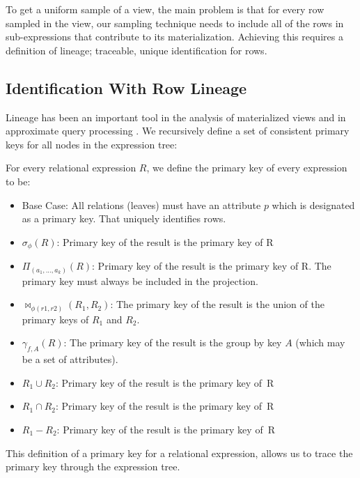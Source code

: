 To get a uniform sample of a view, the main problem is that for every row sampled in the view, our sampling technique needs to include all of the rows in sub-expressions that contribute to its materialization.
Achieving this requires a definition of lineage; traceable, unique identification for rows.

\subsection{Identification With Row Lineage}
\label{lin}
Lineage has been an important tool in the analysis of materialized views \cite{DBLP:journals/vldb/CuiW03} and in approximate query processing \cite{DBLP:conf/sigmod/ZengGMZ14}. %
We recursively define a set of consistent primary keys for all nodes in the expression tree:
\begin{definition} 
For every relational expression $R$, we define the primary key of every expression to be:
\begin{itemize}[noitemsep]
\item Base Case: All relations (leaves) must have an attribute $p$ which is designated as a primary key. That uniquely identifies rows.
\item $\sigma_{\phi}(R)$: Primary key of the result is the primary key of R 
\item $\Pi_{(a_1,...,a_k)}(R)$: Primary key of the result is the primary key of R. The primary key must always be included in the projection.
\item $\bowtie_{\phi (r1,r2)}(R_1,R_2)$: The primary key of the result is the union of the primary keys of $R_1$ and $R_2$. 
\item $\gamma_{f,A}(R)$: The primary key of the result is the group by key $A$ (which may be a set of attributes).
\item $R_1 \cup R_2$: Primary key of the result is the primary key of~R
\item $R_1 \cap R_2$: Primary key of the result is the primary key of~R
\item $R_1 - R_2$: Primary key of the result is the primary key of~R
\end{itemize}
\end{definition}
This definition of a primary key for a relational expression, allows us to trace the primary key through the expression tree.

